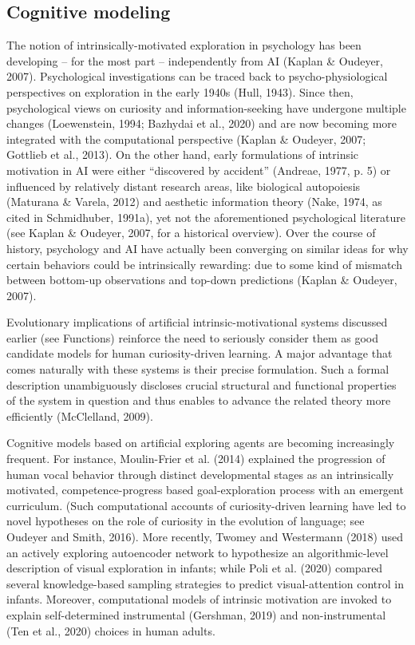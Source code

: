 \subsection{Cognitive modeling} The notion of intrinsically-motivated exploration in psychology has been developing -- for the most part -- independently from AI (Kaplan \& Oudeyer, 2007). Psychological investigations can be traced back to psycho-physiological perspectives on exploration in the early 1940s (Hull, 1943). Since then, psychological views on curiosity and information-seeking have undergone multiple changes (Loewenstein, 1994; Bazhydai et al., 2020) and are now becoming more integrated with the computational perspective (Kaplan \& Oudeyer, 2007; Gottlieb et al., 2013). On the other hand, early formulations of intrinsic motivation in AI were either “discovered by accident” (Andreae, 1977, p. 5) or influenced by relatively distant research areas, like biological autopoiesis (Maturana \& Varela, 2012) and aesthetic information theory (Nake, 1974, as cited in Schmidhuber, 1991a), yet not the aforementioned psychological literature (see Kaplan \& Oudeyer, 2007, for a historical overview). Over the course of history, psychology and AI have actually been converging on similar ideas for why certain behaviors could be intrinsically rewarding: due to some kind of mismatch between bottom-up observations and top-down predictions (Kaplan \& Oudeyer, 2007).

Evolutionary implications of artificial intrinsic-motivational systems discussed earlier (see Functions) reinforce the need to seriously consider them as good candidate models for human curiosity-driven learning. A major advantage that comes naturally with these systems is their precise formulation. Such a formal description unambiguously discloses crucial structural and functional properties of the system in question and thus enables to advance the related theory more efficiently (McClelland, 2009). 

Cognitive models based on artificial exploring agents are becoming increasingly frequent. For instance, Moulin-Frier et al. (2014) explained the progression of human vocal behavior through distinct developmental stages as an intrinsically motivated, competence-progress based goal-exploration process with an emergent curriculum. (Such computational accounts of curiosity-driven learning have led to novel hypotheses on the role of curiosity in the evolution of language; see Oudeyer and Smith, 2016). More recently, Twomey and Westermann (2018) used an actively exploring autoencoder network to hypothesize an algorithmic-level description of visual exploration in infants; while Poli et al. (2020) compared several knowledge-based sampling strategies to predict visual-attention control in infants. Moreover, computational models of intrinsic motivation are invoked to explain self-determined instrumental (Gershman, 2019) and non-instrumental (Ten et al., 2020) choices in human adults.

